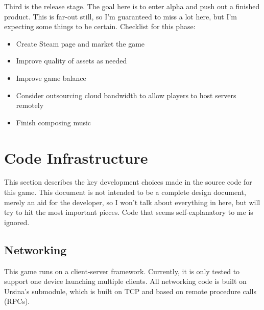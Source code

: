 \documentclass{article}
\begin{document}
Third is the release stage. The goal here is to enter alpha and push out a finished product.
This is far-out still, so I'm guaranteed to miss a lot here, but I'm expecting some things to
be certain.
Checklist for this phase:
\begin{itemize}
    \item Create Steam page and market the game
    \item Improve quality of assets as needed
    \item Improve game balance
    \item Consider outsourcing cloud bandwidth to allow players to host servers remotely
    \item Finish composing music
\end{itemize}

\section{Code Infrastructure}
This section describes the key development choices made in the source code
for this game. This document is not intended to be a complete design
document, merely an aid for the developer, so I won't talk about everything
in here, but will try to hit the most important pieces. Code that seems
self-explanatory to me is ignored.
\subsection{Networking}
This game runs on a client-server framework. Currently, it is only tested to
support one device launching multiple clients.
All networking code is built on Ursina's
 submodule, which is built on TCP and based on remote
procedure calls (RPCs).
\end{document}
